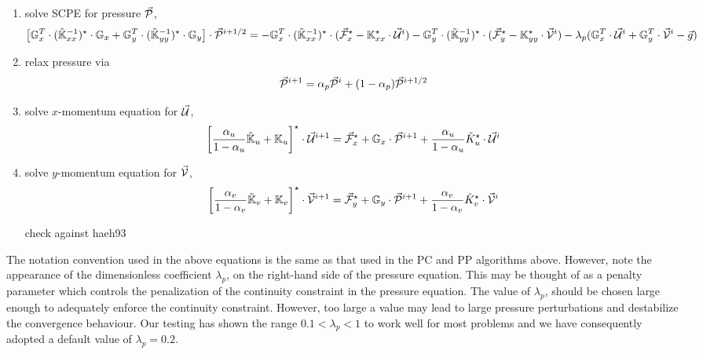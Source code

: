 \documentclass[a4paper,12pt]{article}
\begin{document}
\begin{enumerate}
\item solve SCPE for pressure $\vec{\cal P}$, 
\[
\left[
{\mathbb{G}}_x^T \cdot (\tilde{{\mathbb{K}}}_{xx}^{-1})^\star \cdot {\mathbb{G}}_x +
{\mathbb{G}}_y^T \cdot (\tilde{{\mathbb{K}}}_{yy}^{-1})^\star \cdot {\mathbb{G}}_y 
\right]
\cdot \vec{\cal P}^{i+1/2}
= 
-{\mathbb{G}}_x^T \cdot (\tilde{{\mathbb{K}}}_{xx}^{-1})^\star \cdot 
(\vec{\cal F}^\star_x-{\mathbb{K}}_{xx}^\star \cdot \vec{\cal U}^i )
-{\mathbb{G}}_y^T \cdot (\tilde{{\mathbb{K}}}_{yy}^{-1})^\star \cdot 
(\vec{\cal F}^\star_y-{\mathbb{K}}_{yy}^\star \cdot \vec{\cal V}^i )
- \lambda_p ( {\mathbb{G}}_x^T \cdot \vec{\cal U}^i + {\mathbb{G}}_y^T \cdot \vec{\cal V}^i -\vec{g} )
\]

\item relax pressure via
\[
\vec{\cal P}^{i+1} = \alpha_p \vec{\cal P}^i + (1-\alpha_p) \vec{\cal P}^{i+1/2}
\] 
\item solve $x$-momentum equation for $\vec{\cal U}$,
\[
\left[
\frac{\alpha_u}{1-\alpha_u} \tilde{{\mathbb{K}}}_u + {\mathbb{K}}_u
\right]^\star \cdot 
\vec{\cal U}^{i+1}
= \vec{\cal F}_x^\star + {\mathbb{G}}_x \cdot \vec{\cal P}^{i+1}
+ \frac{\alpha_u}{1-\alpha_u} \tilde{K}_u^\star \cdot \vec{\cal U}^i
\]
 
\item solve $y$-momentum equation for $\vec{\cal V}$,
\[
\left[
\frac{\alpha_v}{1-\alpha_v} \tilde{{\mathbb{K}}}_v + {\mathbb{K}}_v
\right]^\star \cdot 
\vec{\cal V}^{i+1}
= \vec{\cal F}_y^\star + {\mathbb{G}}_y \cdot \vec{\cal P}^{i+1}
+ \frac{\alpha_v}{1-\alpha_v} \tilde{K}_v^\star \cdot \vec{\cal V}^i
\]
 

{\color{red} check against haeh93}



\end{enumerate}




The notation convention used in the above equations is the same as that 
used in the PC and PP algorithms above. However, note the appearance 
of the dimensionless coefficient $\lambda_p$, on the
right-hand side of the pressure equation. This may be thought of 
as a penalty parameter which
controls the penalization of the continuity constraint in the pressure 
equation. The value of $\lambda_p$,
should be chosen large enough to adequately enforce the continuity 
constraint. However, too
large a value may lead to large pressure perturbations and destabilize 
the convergence behaviour.
Our testing has shown the range $0.1 < \lambda_p <1$ 
to work well for most problems and we have
consequently adopted a default value of $\lambda_p=0.2$.

\end{document}
